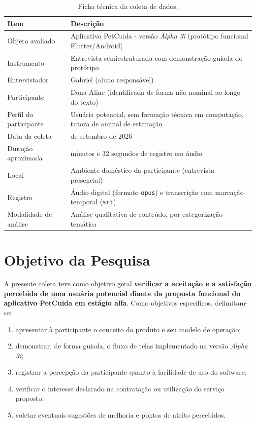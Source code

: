 \documentclass[12pt,a4paper]{article}
\newcommand{\entrevistador}{Gabriel}
\newcommand{\participante}{Dona Aline}
\begin{document}
\begin{table}[h!]
\centering
\begin{tabular}{@{}>{\raggedright\arraybackslash}p{5.2cm}>{\raggedright\arraybackslash}p{8.5cm}@{}}
\toprule
\textbf{Item} & \textbf{Descrição} \\
\midrule
Objeto avaliado & Aplicativo PetCuida - versão \textit{Alpha 3i} (protótipo funcional Flutter/Android) \\
Instrumento & Entrevista semiestruturada com demonstração guiada do protótipo \\
Entrevistador & \entrevistador{} (aluno responsável) \\
Participante & \participante{} (identificada de forma não nominal ao longo do texto) \\
Perfil do participante & Usuária potencial, sem formação técnica em computação, tutora de animal de estimação \\
Data da coleta & 16 de setembro de 2026 \\
Duração aproximada & 7 minutos e 32 segundos de registro em áudio \\
Local & Ambiente doméstico da participante (entrevista presencial) \\
Registro & Áudio digital (formato \texttt{opus}) e transcrição com marcação temporal (\texttt{srt}) \\
Modalidade de análise & Análise qualitativa de conteúdo, por categorização temática \\
\bottomrule
\end{tabular}
\caption{Ficha técnica da coleta de dados.}
\end{table}

\section{Objetivo da Pesquisa}

A presente coleta teve como objetivo geral \textbf{verificar a aceitação e a satisfação
percebida de uma usuária potencial diante da proposta funcional do aplicativo PetCuida em
estágio alfa}. Como objetivos específicos, delimitam-se:

\begin{enumerate}[label=\alph*)]
  \item apresentar à participante o conceito do produto e seu modelo de operação;
  \item demonstrar, de forma guiada, o fluxo de telas implementado na versão \textit{Alpha 3i};
  \item registrar a percepção da participante quanto à facilidade de uso do software;
  \item verificar o interesse declarado na contratação ou utilização do serviço proposto;
  \item coletar eventuais sugestões de melhoria e pontos de atrito percebidos.
\end{enumerate}
\end{document}
